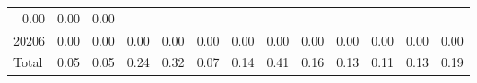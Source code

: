 \begin{table}[!h]
\begin{tabular}{lllllllllllll}
  \multicolumn{1}{r}{0.00} &
  \multicolumn{1}{r}{0.00} &
  \multicolumn{1}{r}{0.00} \\
\multicolumn{1}{l}{\hspace{1em}20206} &
  \multicolumn{1}{|r}{0.00} &
  \multicolumn{1}{r}{0.00} &
  \multicolumn{1}{r}{0.00} &
  \multicolumn{1}{r}{0.00} &
  \multicolumn{1}{r}{0.00} &
  \multicolumn{1}{r}{0.00} &
  \multicolumn{1}{r}{0.00} &
  \multicolumn{1}{r}{0.00} &
  \multicolumn{1}{r}{0.00} &
  \multicolumn{1}{r}{0.00} &
  \multicolumn{1}{r}{0.00} &
  \multicolumn{1}{r}{0.00} \\
\multicolumn{1}{l}{\hspace{1em}Total} &
  \multicolumn{1}{|r}{0.05} &
  \multicolumn{1}{r}{0.05} &
  \multicolumn{1}{r}{0.24} &
  \multicolumn{1}{r}{0.32} &
  \multicolumn{1}{r}{0.07} &
  \multicolumn{1}{r}{0.14} &
  \multicolumn{1}{r}{0.41} &
  \multicolumn{1}{r}{0.16} &
  \multicolumn{1}{r}{0.13} &
  \multicolumn{1}{r}{0.11} &
  \multicolumn{1}{r}{0.13} &
  \multicolumn{1}{r}{0.19} \\
\cline{1-13}
\end{tabular}
\end{table}
